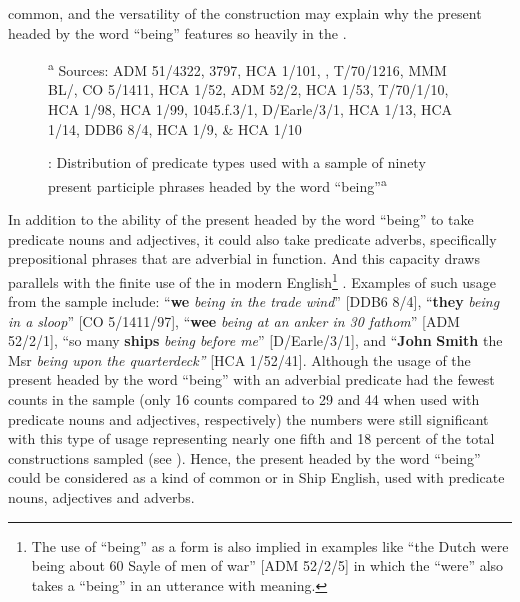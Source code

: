 common, and the versatility of the construction may explain why the present  headed by the word “being” features so heavily in the . 

  
\begin{figure}

\caption{\label{fig:key:5.1}: Distribution of predicate types used with a sample of ninety present participle phrases headed by the word “being”\textsuperscript{a}} 

\textsuperscript{a} Sources: ADM 51/4322, 3797, HCA 1/101, \citealt{Brown2011}, T/70/1216, MMM BL/\citealt{Egerton2395}, CO 5/1411, HCA 1/52, ADM 52/2, HCA 1/53, T/70/1/10, HCA 1/98, HCA 1/99, 1045.f.3/1, D/Earle/3/1, HCA 1/13, HCA 1/14, DDB6 8/4, HCA 1/9, \& HCA 1/10
\end{figure}


In addition to the ability of the present  headed by the word “being” to take predicate nouns and adjectives, it could also take predicate adverbs, specifically prepositional phrases that are adverbial in function. And this capacity draws parallels with the finite use of the  in modern English\footnote{The use of “being” as a  form is also implied in examples like “the Dutch were being about 60 Sayle of men of war” [ADM 52/2/5] in which the  “were” also takes a  “being” in an utterance with  meaning.} . Examples of such usage from the sample include: “\textbf{we} \textit{being in the trade wind}” [DDB6 8/4], “\textbf{they} \textit{being in a sloop}” [CO 5/1411/97], “\textbf{wee} \textit{being at an anker in 30 fathom}” [ADM 52/2/1], “so many \textbf{ships} \textit{being before me}” [D/Earle/3/1], and “\textbf{John} \textbf{Smith} the Msr \textit{being upon the quarterdeck”} [HCA 1/52/41]. Although the usage of the present  headed by the word “being” with an adverbial predicate had the fewest counts in the sample (only 16 counts compared to 29 and 44 when used with predicate nouns and adjectives, respectively) the numbers were still significant with this type of usage representing nearly one fifth and 18 percent of the total constructions sampled (see ). Hence, the present  headed by the word “being” could be considered as a kind of common  or  in Ship English, used with predicate nouns, adjectives and adverbs. 

